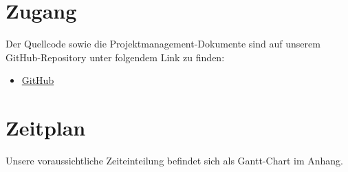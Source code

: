 \documentclass[a4paper,12pt]{article}
\begin{document}
\section{Zugang} \label{zugang}
Der Quellcode sowie die Projektmanagement-Dokumente sind auf unserem GitHub-Repository unter folgendem Link zu finden: 
\begin{itemize}
     \item \href{https://github.com/wittrockscode/geosoft2-projekt/tree/main}{GitHub}
\end{itemize}

   

\section{Zeitplan} \label{zeitplan}
Unsere voraussichtliche Zeiteinteilung befindet sich als Gantt-Chart im Anhang.


\clearpage


\end{document}
